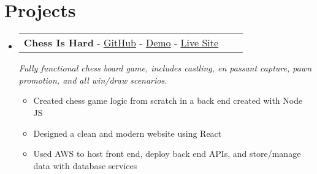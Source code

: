 \documentclass[a4paper,11pt]{article}
\makeatletter
\newcommand{\resumeItem}[1]{
  \item\small{#1}
}
\newcommand{\resumeItemListStart}{\begin{itemize}[rightmargin=0.11in]}
\newcommand{\resumeItemListEnd}{\end{itemize}}
\newcommand{\resumeTrioHeading}[3]{
  \item\small{
    \begin{tabular*}{0.96\textwidth}[t]{
      l@{\extracolsep{\fill}}c@{\extracolsep{\fill}}r
    }
      #1
    \end{tabular*}
  }
}
\newcommand{\resumeHeadingListStart}{
  \begin{itemize}[leftmargin=0.0in, label={}]
}
\newcommand{\resumeHeadingListEnd}{\end{itemize}}
\makeatother
\begin{document}
\section{Projects}
  \resumeHeadingListStart{}
    \resumeTrioHeading{\textbf{Chess Is Hard} - \href{https://github.com/kvschneider0/chess}{\uline{GitHub}} - \href{https://youtu.be/43IuuSmvnHs}{\uline{Demo}} - \href{https://dev.di6bue370azmc.amplifyapp.com/}{\uline{Live Site}}}
    {}{}
      \textit{Fully functional chess board game, includes castling, en passant capture, pawn promotion, and all win/draw scenarios.}
      \resumeItemListStart{}
        \resumeItem{Created chess game logic from scratch in a back end created with Node JS}
        \resumeItem{Designed a clean and modern website using React}
        \resumeItem{Used AWS to host front end, deploy back end APIs, and store/manage data with database services}
      \resumeItemListEnd{}

      

  \resumeHeadingListEnd{}

\end{document}
